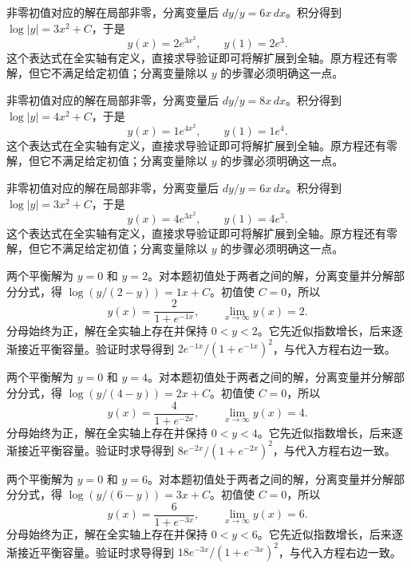 \documentclass[12pt,fontset=fandol]{ctexart}
\begin{document}
\begin{solve}\label{ans:c23q4}
非零初值对应的解在局部非零，分离变量后 $dy/y=6x\,dx$。积分得到 $\log|y|=3x^2+C$，于是
\[
y(x)=2e^{3x^2},\qquad y(1)=2e^{3}.
\]
这个表达式在全实轴有定义，直接求导验证即可将解扩展到全轴。原方程还有零解，但它不满足给定初值；分离变量除以 $y$ 的步骤必须明确这一点。
\end{solve}

\begin{solve}\label{ans:c23q5}
非零初值对应的解在局部非零，分离变量后 $dy/y=8x\,dx$。积分得到 $\log|y|=4x^2+C$，于是
\[
y(x)=1e^{4x^2},\qquad y(1)=1e^{4}.
\]
这个表达式在全实轴有定义，直接求导验证即可将解扩展到全轴。原方程还有零解，但它不满足给定初值；分离变量除以 $y$ 的步骤必须明确这一点。
\end{solve}

\begin{solve}\label{ans:c23q6}
非零初值对应的解在局部非零，分离变量后 $dy/y=6x\,dx$。积分得到 $\log|y|=3x^2+C$，于是
\[
y(x)=4e^{3x^2},\qquad y(1)=4e^{3}.
\]
这个表达式在全实轴有定义，直接求导验证即可将解扩展到全轴。原方程还有零解，但它不满足给定初值；分离变量除以 $y$ 的步骤必须明确这一点。
\end{solve}

\begin{solve}\label{ans:c23q7}
两个平衡解为 $y=0$ 和 $y=2$。对本题初值处于两者之间的解，分离变量并分解部分分式，得 $\log(y/(2-y))=1x+C$。初值使 $C=0$，所以
\[
y(x)=\frac{2}{1+e^{-1x}},\qquad\lim_{x\to\infty}y(x)=2.
\]
分母始终为正，解在全实轴上存在并保持 $0<y<2$。它先近似指数增长，后来逐渐接近平衡容量。验证时求导得到 $2e^{-1x}/(1+e^{-1x})^2$，与代入方程右边一致。
\end{solve}

\begin{solve}\label{ans:c23q8}
两个平衡解为 $y=0$ 和 $y=4$。对本题初值处于两者之间的解，分离变量并分解部分分式，得 $\log(y/(4-y))=2x+C$。初值使 $C=0$，所以
\[
y(x)=\frac{4}{1+e^{-2x}},\qquad\lim_{x\to\infty}y(x)=4.
\]
分母始终为正，解在全实轴上存在并保持 $0<y<4$。它先近似指数增长，后来逐渐接近平衡容量。验证时求导得到 $8e^{-2x}/(1+e^{-2x})^2$，与代入方程右边一致。
\end{solve}

\begin{solve}\label{ans:c23q9}
两个平衡解为 $y=0$ 和 $y=6$。对本题初值处于两者之间的解，分离变量并分解部分分式，得 $\log(y/(6-y))=3x+C$。初值使 $C=0$，所以
\[
y(x)=\frac{6}{1+e^{-3x}},\qquad\lim_{x\to\infty}y(x)=6.
\]
分母始终为正，解在全实轴上存在并保持 $0<y<6$。它先近似指数增长，后来逐渐接近平衡容量。验证时求导得到 $18e^{-3x}/(1+e^{-3x})^2$，与代入方程右边一致。
\end{solve}
\end{document}
